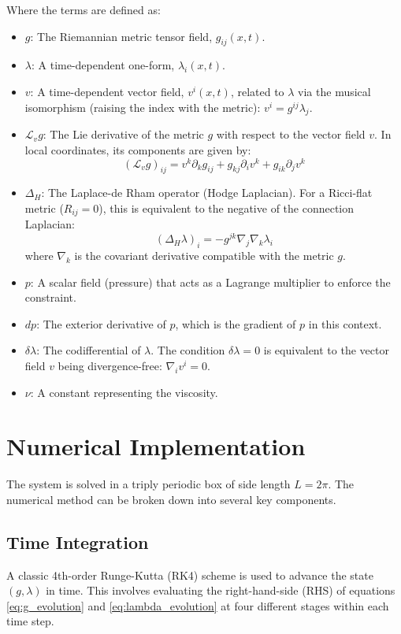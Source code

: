 \documentclass{article}
\begin{document}
Where the terms are defined as:
\begin{itemize}
    \item $g$: The Riemannian metric tensor field, $g_{ij}(x,t)$.
    \item $\lambda$: A time-dependent one-form, $\lambda_i(x,t)$.
    \item $v$: A time-dependent vector field, $v^i(x,t)$, related to $\lambda$ via the musical isomorphism (raising the index with the metric): $v^i = g^{ij}\lambda_j$.
    \item $\mathcal{L}_v g$: The Lie derivative of the metric $g$ with respect to the vector field $v$. In local coordinates, its components are given by:
    \begin{equation}
        (\mathcal{L}_v g)_{ij} = v^k \partial_k g_{ij} + g_{kj} \partial_i v^k + g_{ik} \partial_j v^k
    \end{equation}
    \item $\Delta_H$: The Laplace-de Rham operator (Hodge Laplacian). For a Ricci-flat metric ($R_{ij}=0$), this is equivalent to the negative of the connection Laplacian:
    \begin{equation}
        (\Delta_H \lambda)_i = -g^{jk}\nabla_j\nabla_k \lambda_i
    \end{equation}
    where $\nabla_k$ is the covariant derivative compatible with the metric $g$.
    \item $p$: A scalar field (pressure) that acts as a Lagrange multiplier to enforce the constraint.
    \item $dp$: The exterior derivative of $p$, which is the gradient of $p$ in this context.
    \item $\delta \lambda$: The codifferential of $\lambda$. The condition $\delta \lambda = 0$ is equivalent to the vector field $v$ being divergence-free: $\nabla_i v^i = 0$.
    \item $\nu$: A constant representing the viscosity.
\end{itemize}

\section{Numerical Implementation}
The system is solved in a triply periodic box of side length $L=2\pi$. The numerical method can be broken down into several key components.

\subsection{Time Integration}
A classic 4th-order Runge-Kutta (RK4) scheme is used to advance the state $(g, \lambda)$ in time. This involves evaluating the right-hand-side (RHS) of equations \eqref{eq:g_evolution} and \eqref{eq:lambda_evolution} at four different stages within each time step.
\end{document}
